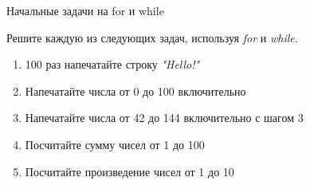 \documentclass[12pt]{article} %
\begin{document}
	\begin{center}
		\Large{Начальные задачи на for и while}
	\end{center}

Решите каждую из следующих задач, используя \textit{for} и \textit{while}.
\begin{enumerate}
	\item 100 раз напечатайте строку \textit{"Hello!"}
	\item Напечатайте числа от 0 до 100 включительно
	\item Напечатайте числа от 42 до 144 включительно с шагом 3
	\item Посчитайте сумму чисел от 1 до 100
	\item Посчитайте произведение чисел от 1 до 10
	
\end{enumerate}
\end{document}
